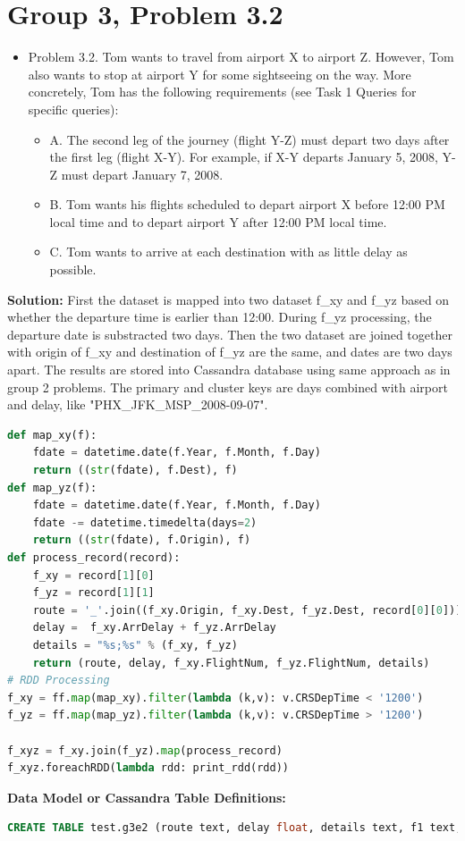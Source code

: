 \documentclass[fontsize=11pt,paper=a4]{scrartcl}
\begin{document}
\section{Group 3, Problem 3.2}
\begin{itemize}
\item Problem 3.2. Tom wants to travel from airport X to airport Z. However, Tom also wants to stop at airport Y for some sightseeing on the way. More concretely, Tom has the following requirements (see Task 1 Queries for specific queries):
\begin{itemize}
\item A. The second leg of the journey (flight Y-Z) must depart two days after the first leg (flight X-Y). For example, if X-Y departs January 5, 2008, Y-Z must depart January 7, 2008.
\item B. Tom wants his flights scheduled to depart airport X before 12:00 PM local time and to depart airport Y after 12:00 PM local time.
\item C. Tom wants to arrive at each destination with as little delay as possible.
\end{itemize}
\end{itemize}
\textbf{Solution:} First the dataset is mapped into two dataset f{\_}xy and f{\_}yz based on whether the departure time is earlier than 12:00. During f{\_}yz processing, the departure date is substracted two days. Then the two dataset are joined together with origin of f{\_}xy and destination of f{\_}yz are the same, and dates are two days apart. The results are stored into Cassandra database using same approach as in group 2 problems. The primary and cluster keys are days combined with airport and delay, like "PHX{\_}JFK{\_}MSP{\_}2008-09-07". 
\begin{lstlisting}[basicstyle=\small,language = python] 
def map_xy(f): 
    fdate = datetime.date(f.Year, f.Month, f.Day)
    return ((str(fdate), f.Dest), f)
def map_yz(f):
    fdate = datetime.date(f.Year, f.Month, f.Day)
    fdate -= datetime.timedelta(days=2)
    return ((str(fdate), f.Origin), f)
def process_record(record): 
    f_xy = record[1][0]
    f_yz = record[1][1]
    route = '_'.join((f_xy.Origin, f_xy.Dest, f_yz.Dest, record[0][0]))
    delay =  f_xy.ArrDelay + f_yz.ArrDelay
    details = "%s;%s" % (f_xy, f_yz)
    return (route, delay, f_xy.FlightNum, f_yz.FlightNum, details)    
# RDD Processing
f_xy = ff.map(map_xy).filter(lambda (k,v): v.CRSDepTime < '1200')
f_yz = ff.map(map_yz).filter(lambda (k,v): v.CRSDepTime > '1200')

f_xyz = f_xy.join(f_yz).map(process_record) 
f_xyz.foreachRDD(lambda rdd: print_rdd(rdd))
\end{lstlisting}
\textbf{Data Model or Cassandra Table Definitions: }
\begin{lstlisting}[basicstyle=\small,language = sql] 
CREATE TABLE test.g3e2 (route text, delay float, details text, f1 text, f2 text, PRIMARY KEY (route, f1, f2));  
\end{lstlisting} 
\end{document}
